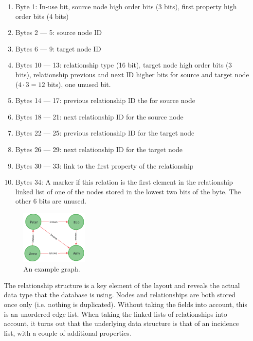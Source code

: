         \begin{enumerate}
            \item Byte 1: In-use bit, source node high order bits (3 bits), first property high order bits (4 bits)
            \item Bytes 2 --- 5: source node ID 
            \item Bytes 6 --- 9: target node ID 
            \item Bytes 10 --- 13: relationship type (16 bit), target node high order bits (3 bits), relationship previous and next ID higher bits for source and target node ($4 \cdot 3 = 12$ bits), one unused bit.
            \item Bytes 14 --- 17: previous relationship ID the for source node
            \item Bytes 18 --- 21: next relationship ID for the source node
            \item Bytes 22 --- 25: previous relationship ID for the target node
            \item Bytes 26 --- 29: next relationship ID for the target node
            \item Bytes 30 --- 33: link to the first property of the relationship
            \item Bytes 34: A marker if this relation is the first element in the relationship linked list of one of the nodes stored in the lowest two bits of the byte. 
            The other 6 bits are unused.
        \end{enumerate}
        
        \begin{figure}[htp]
            \begin{center}
                \includegraphics[keepaspectratio,height=0.4\textheight,width=0.3\textwidth]{img/04-databases/graph.png}
            \end{center}
            \caption{An example graph.}
            \label{n4j-ex-gr}
        \end{figure}
        
        The relationship structure is a key element of the layout and reveals the actual data type that the database is using.
        Nodes and relationships are both stored once only (i.e. nothing is duplicated).
        Without taking the fields into account, this is an unordered edge list.
        When taking the linked lists of relationships into account, it turns out that the underlying data structure is that of an incidence list, with a couple of additional properties.
        
